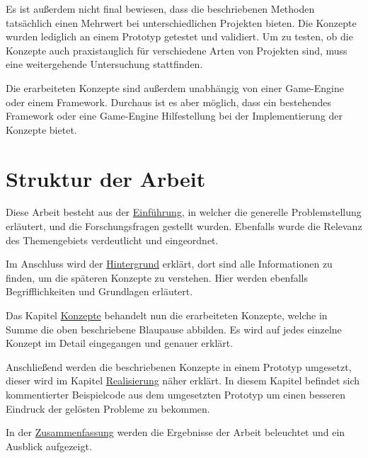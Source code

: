 Es ist außerdem nicht final bewiesen, dass die beschriebenen Methoden tatsächlich einen Mehrwert bei unterschiedlichen Projekten bieten. Die Konzepte wurden lediglich an einem Prototyp getestet und validiert. Um zu testen, ob die Konzepte auch praxistauglich für verschiedene Arten von Projekten sind, muss eine weitergehende Untersuchung stattfinden.

Die erarbeiteten Konzepte sind außerdem unabhängig von einer Game-Engine oder einem Framework. Durchaus ist es aber möglich, dass ein bestehendes Framework oder eine Game-Engine Hilfestellung bei der Implementierung der Konzepte bietet. 

\section{Struktur der Arbeit}

Diese Arbeit besteht aus der \hyperref[sec:einfuehrung]{Einführung}, in welcher die generelle Problemstellung erläutert, und die Forschungsfragen gestellt wurden. Ebenfalls wurde die Relevanz des Themengebiets verdeutlicht und eingeordnet.

Im Anschluss wird der  \hyperref[sec:hintergrund]{Hintergrund} erklärt, dort sind alle Informationen zu finden, um die späteren Konzepte zu verstehen. Hier werden ebenfalls Begrifflichkeiten und Grundlagen erläutert.

Das Kapitel \hyperref[sec:konzepte]{Konzepte} behandelt nun die erarbeiteten Konzepte, welche in Summe die oben beschriebene Blaupause abbilden. Es wird auf jedes einzelne Konzept im Detail eingegangen und genauer erklärt. 
 
Anschließend werden die beschriebenen Konzepte in einem Prototyp umgesetzt, dieser wird im Kapitel \hyperref[sec:realisierung]{Realisierung} näher erklärt. In diesem Kapitel befindet sich kommentierter Beispielcode aus dem umgesetzten Prototyp um einen besseren Eindruck der gelösten Probleme zu bekommen.

In der \hyperref[sec:zusammenfassung]{Zusammenfassung} werden die Ergebnisse der Arbeit beleuchtet und ein Ausblick aufgezeigt.
